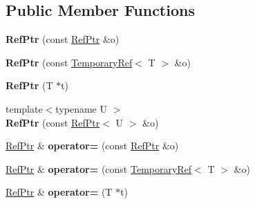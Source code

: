 \subsection*{Public Member Functions}
\begin{DoxyCompactItemize}
\item 
\hypertarget{classmozilla_1_1_ref_ptr_ae72d21fda9ad3f180d6c8a709e08058d}{{\bfseries Ref\-Ptr} (const \hyperlink{classmozilla_1_1_ref_ptr}{Ref\-Ptr} \&o)}\label{classmozilla_1_1_ref_ptr_ae72d21fda9ad3f180d6c8a709e08058d}

\item 
\hypertarget{classmozilla_1_1_ref_ptr_aab46f6e9d3f998e733e22c731ee514c5}{{\bfseries Ref\-Ptr} (const \hyperlink{classmozilla_1_1_temporary_ref}{Temporary\-Ref}$<$ T $>$ \&o)}\label{classmozilla_1_1_ref_ptr_aab46f6e9d3f998e733e22c731ee514c5}

\item 
\hypertarget{classmozilla_1_1_ref_ptr_a059916d64c199db20c05d579e1045e07}{{\bfseries Ref\-Ptr} (T $\ast$t)}\label{classmozilla_1_1_ref_ptr_a059916d64c199db20c05d579e1045e07}

\item 
\hypertarget{classmozilla_1_1_ref_ptr_af9f1c2a35a3f737bf9efa6b0acbe480c}{{\footnotesize template$<$typename U $>$ }\\{\bfseries Ref\-Ptr} (const \hyperlink{classmozilla_1_1_ref_ptr}{Ref\-Ptr}$<$ U $>$ \&o)}\label{classmozilla_1_1_ref_ptr_af9f1c2a35a3f737bf9efa6b0acbe480c}

\item 
\hypertarget{classmozilla_1_1_ref_ptr_a17510a76f2a10669b67add979ec8f029}{\hyperlink{classmozilla_1_1_ref_ptr}{Ref\-Ptr} \& {\bfseries operator=} (const \hyperlink{classmozilla_1_1_ref_ptr}{Ref\-Ptr} \&o)}\label{classmozilla_1_1_ref_ptr_a17510a76f2a10669b67add979ec8f029}

\item 
\hypertarget{classmozilla_1_1_ref_ptr_af0ea24480ea215c2c880752953bf406c}{\hyperlink{classmozilla_1_1_ref_ptr}{Ref\-Ptr} \& {\bfseries operator=} (const \hyperlink{classmozilla_1_1_temporary_ref}{Temporary\-Ref}$<$ T $>$ \&o)}\label{classmozilla_1_1_ref_ptr_af0ea24480ea215c2c880752953bf406c}

\item 
\hypertarget{classmozilla_1_1_ref_ptr_abd28b8e687bd0bacce4c07c6e5af517f}{\hyperlink{classmozilla_1_1_ref_ptr}{Ref\-Ptr} \& {\bfseries operator=} (T $\ast$t)}\label{classmozilla_1_1_ref_ptr_abd28b8e687bd0bacce4c07c6e5af517f}


\end{DoxyCompactItemize}
